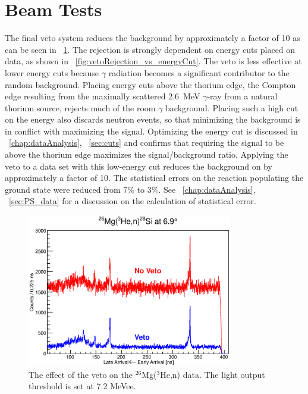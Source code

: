 \section{Beam Tests}

The final veto system reduces the background by approximately a factor of 10 as can be seen in {\fig}~\ref{fig:veto_26Mg}.  The rejection is strongly dependent on energy cuts placed on data, as shown in {\fig}~\ref{fig:vetoRejection_vs_energyCut}.  The veto is less effective at lower energy cuts because $\gamma$ radiation becomes a significant contributor to the random background.  Placing energy cuts above the thorium edge, the Compton edge resulting from the maximally scattered 2.6~MeV $\gamma$-ray \citep{PDG} from a natural thorium source, rejects much of the room $\gamma$ background.  Placing such a high cut on the energy also discards neutron events, so that minimizing the background is in conflict with maximizing the signal.  Optimizing the energy cut is discussed in {\chap}~\ref{chap:dataAnalysis}, {\sect}~\ref{sec:cuts} and confirms that requiring the signal to be above the thorium edge maximizes the signal/background ratio.  Applying the veto to a data set with this low-energy cut reduces the background on \MgReaction by approximately a factor of 10.  The statistical errors on the reaction populating the ground state were reduced from 7\% to 3\%.  See {\chap}~\ref{chap:dataAnalysis}, {\sect}~\ref{sec:PS_data} for a discussion on the calculation of statistical error.
\begin{figure}[!htbp]
\centering
\includegraphics[width=0.8\textwidth]{figures/26Mg_vetoEffect.eps}
\caption[Effect of the veto on the timing spectrum due to \MgReaction.]{\label{fig:vetoData}The effect of the veto on the $^{26}$Mg($^3$He,n) data.  The light output threshold is set at 7.2 MeVee.}
\label{fig:veto_26Mg}
\end{figure}
  

